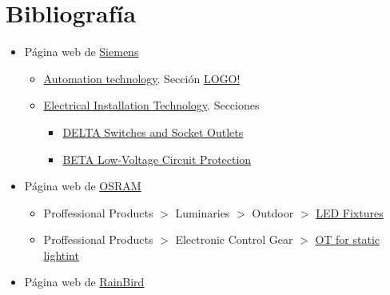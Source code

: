 \section{Bibliograf\'ia}

\begin{itemize}
 \item P\'agina web de \href{http://www.siemens.com}{Siemens}\label{Siemens}
 \begin{itemize}
  \item \href{https://eb.automation.siemens.com/goos/catalog/Pages/ProductData.aspx?catalogRegion=WW&language=en&regionUrl=\%2f&activetab=order&nodeID=10045207#activetab=product&}{Automation technology}. Secci\'on \href{https://eb.automation.siemens.com/goos/catalog/Pages/ProductData.aspx?catalogRegion=WW&language=en&regionUrl=\%2f&activetab=order&nodeID=10000027#activetab=order&}{LOGO!}\label{LOGO}
  \item \href{http://www.automation.siemens.com/MCMS/ELECTRICAL-INSTALLATION-TECHNOLOGY/EN/Pages/Electrical_Installation_Technology.aspx}{Electrical Installation Technology}. Secciones
  \begin{itemize}
   \item \href{http://www.automation.siemens.com/mcms/electrical-installation-technology/EN/products/delta/Functions/Pages/delta_functions_electrical_installation.aspx}{DELTA Switches and Socket Outlets}\label{Pulsadores}
   \item \href{http://www.automation.siemens.com/mcms/electrical-installation-technology/EN/products/beta/Pages/beta_low_voltage_circuit_protection_electrical_installation.aspx}{BETA Low-Voltage Circuit Protection}\label{Magnetotermicos}
  \end{itemize}
 \end{itemize}
 \item P\'agina web de \href{http://www.osram.com}{OSRAM}\label{OSRAM}
 \begin{itemize}
  \item Proffessional Products $>$ Luminaries $>$ Outdoor $>$ \href{http://www.osram.com/osram_com/Professionals/Luminaires/Outdoor/LED_Fixtures/index.html}{LED Fixtures}\label{LED}
  \item Proffessional Products $>$ Electronic Control Gear $>$ \href{http://www.osram.com/osram_com/Professionals/ECG_\%26_LMS/ECGs_for_LED_modules/OT_static/index.html}{OT for static lightint}\label{OT}
 \end{itemize}
 \item P\'agina web de \href{http://www.rainbird.es}{RainBird}\label{RainBird}

\end{itemize}
